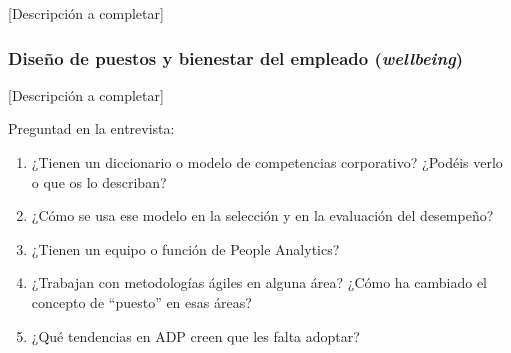 
[Descripción a completar]

\subsubsection{Diseño de puestos y bienestar del empleado (\textit{wellbeing})}


[Descripción a completar]

\begin{notaequipo}
  Preguntad en la entrevista:
  \begin{enumerate}
    \item ¿Tienen un diccionario o modelo de competencias corporativo?
          ¿Podéis verlo o que os lo describan?
    \item ¿Cómo se usa ese modelo en la selección y en la evaluación del desempeño?
    \item ¿Tienen un equipo o función de People Analytics?
    \item ¿Trabajan con metodologías ágiles en alguna área? ¿Cómo ha cambiado
          el concepto de ``puesto'' en esas áreas?
    \item ¿Qué tendencias en ADP creen que les falta adoptar?
  \end{enumerate}
\end{notaequipo}

